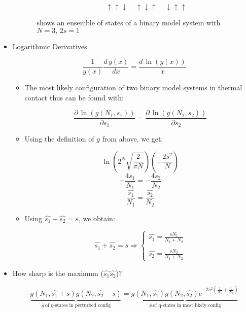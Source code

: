 \begin{itemize}
\begin{itemize}
\begin{itemize}
              $$\boxed{\uparrow\uparrow\downarrow}\quad\boxed{\uparrow\downarrow\uparrow}\quad\boxed{\downarrow\uparrow\uparrow}$$

              shows an ensemble of states of a binary model system with $N=3,\,2s=1$

          \end{itemize}

    \end{itemize}

  \item Logarithmic Derivatives

    $$\frac{1}{y(x)}\frac{d\,y(x)}{dx}=\frac{d\,\ln(y(x))}{x}$$

    \begin{itemize}

      \item The most likely configuration of two binary model systems in thermal contact thus can be found with:

        $$\frac{\partial\,\ln(g(N_1,s_1))}{\partial s_1}=\frac{\partial\,\ln(g(N_2,s_2))}{\partial s_2}$$

      \item Using the definition of $g$ from above, we get:

        $$\ln\left(2^N\sqrt{\frac{2}{\pi N}}\right)\left( -\frac{2s^2}{N} \right)$$
        $$-\frac{4s_1}{N_1}=-\frac{4s_2}{N_2}$$
        $$\boxed{\frac{\hat{s_1}}{N_1}=\frac{\hat{s_2}}{N_2}}$$

      \item Using $\hat{s_1}+\hat{s_2}=s$, we obtain:

        $$\hat{s_1}+\hat{s_2}=s\Rightarrow\left\{\begin{array}{l} \hat{s_1}=\displaystyle\frac{sN_1}{N_1+N_2}\\\\\hat{s_2}=\displaystyle\frac{sN_2}{N_1+N_2}\end{array}$$

    \end{itemize}

  \item How sharp is the maximum ($\hat{s_1}\hat{s_2}$)?

    $$\underbrace{g(N_1,\hat{s_1}+s)g(N_2,\hat{s_2}-s)}_{\text{\# of q-states in perturbed config}}=\underbrace{g(N_1,\hat{s_1})g(N_2,\hat{s_2})e^{-2s^2\left( \frac{1}{N_1}+\frac{1}{N_2} \right)}}_{\text{\# of q-states in most likely config}}$$

    \begin{itemize}


\end{itemize}
\end{itemize}
